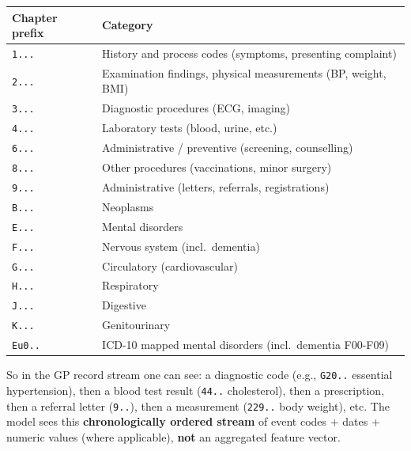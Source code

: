 \documentclass[
  11pt,
]{article}
\newcommand{\passthrough}[1]{#1}
\newcounter{none} %
\begin{document}
{\def\LTcaptype{none} %
\begin{longtable}[]{|>{\raggedright\arraybackslash}p{}|>{\raggedright\arraybackslash}p{}|}
\hline
\begin{minipage}[b]{\linewidth}\raggedright
Chapter prefix
\end{minipage} & \begin{minipage}[b]{\linewidth}\raggedright
Category
\end{minipage} \\
\hline
\hline
\endhead
\hline
\endlastfoot
\passthrough{\lstinline!1...!} & History and process codes (symptoms,
presenting complaint) \\
\hline
\passthrough{\lstinline!2...!} & Examination findings, physical
measurements (BP, weight, BMI) \\
\hline
\passthrough{\lstinline!3...!} & Diagnostic procedures (ECG, imaging) \\
\hline
\passthrough{\lstinline!4...!} & Laboratory tests (blood, urine,
etc.) \\
\hline
\passthrough{\lstinline!6...!} & Administrative / preventive (screening,
counselling) \\
\hline
\passthrough{\lstinline!8...!} & Other procedures (vaccinations, minor
surgery) \\
\hline
\passthrough{\lstinline!9...!} & Administrative (letters, referrals,
registrations) \\
\hline
\passthrough{\lstinline!B...!} & Neoplasms \\
\hline
\passthrough{\lstinline!E...!} & Mental disorders \\
\hline
\passthrough{\lstinline!F...!} & Nervous system (incl.~dementia) \\
\hline
\passthrough{\lstinline!G...!} & Circulatory (cardiovascular) \\
\hline
\passthrough{\lstinline!H...!} & Respiratory \\
\hline
\passthrough{\lstinline!J...!} & Digestive \\
\hline
\passthrough{\lstinline!K...!} & Genitourinary \\
\hline
\passthrough{\lstinline!Eu0..!} & ICD-10 mapped mental disorders
(incl.~dementia F00-F09) \\
\hline
\end{longtable}
}

So in the GP record stream one can see: a diagnostic code (e.g.,
\passthrough{\lstinline!G20..!} essential hypertension), then a blood
test result (\passthrough{\lstinline!44..!} cholesterol), then a
prescription, then a referral letter (\passthrough{\lstinline!9..!}),
then a measurement (\passthrough{\lstinline!229..!} body weight), etc.
The model sees this \textbf{chronologically ordered stream} of event
codes + dates + numeric values (where applicable), \textbf{not} an
aggregated feature vector.
\end{document}
